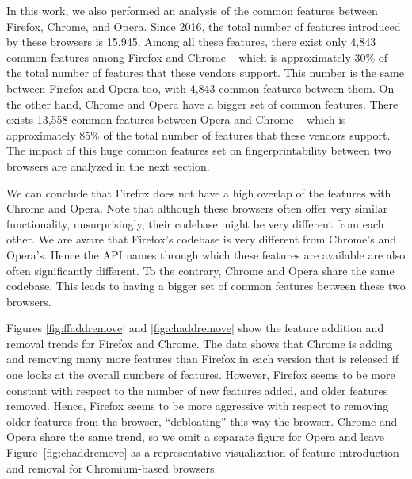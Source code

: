 
  In this work, we also performed an analysis of the common features
  between Firefox, Chrome, and Opera. Since 2016, the total number of features
  introduced by these browsers is 15,945. Among all these features,
  there exist only 4,843 common features among Firefox and Chrome -- which is
  approximately 30\% of the total number of features that these
  vendors support. This number is the same between Firefox and Opera too, with
  4,843 common features between them. On the other hand, Chrome and Opera
  have a bigger set of common features. There exists 13,558 
  common features between Opera and Chrome -- which is approximately 85\% of the total
  number of features that these vendors support. The impact of this huge common features set
  on fingerprintability between two browsers are analyzed in the next section.

  We can conclude that Firefox does not have a high overlap of the features with Chrome and Opera.
  Note that although these browsers often offer very similar functionality,
  unsurprisingly, their codebase might be very different from each other.
  We are aware that Firefox's codebase is very different from Chrome's and Opera's.
  Hence the API names through which these features are available are also often
  significantly different. 
  To the contrary, Chrome and Opera share the same codebase.
  This leads to having a bigger set of common features between these two browsers. %

  Figures \ref{fig:ffaddremove} and \ref{fig:chaddremove} show the
  feature addition and removal trends for Firefox and Chrome. The data
  shows that Chrome is adding and removing many more features than
  Firefox in each version that is released if one looks at the overall
  numbers of features. However, Firefox seems to be more constant with
  respect to the number of new features added, and older features
  removed. Hence, Firefox seems to be more aggressive with respect to
  removing older features from the browser, ``debloating'' this way 
  the browser. Chrome and Opera share the same trend, so we omit a separate figure for Opera and leave Figure~\ref{fig:chaddremove} as a representative visualization of feature introduction and removal for Chromium-based browsers.

